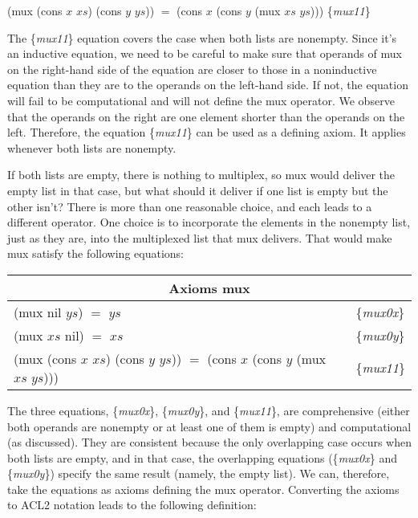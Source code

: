 \hspace{1cm} \textsf{(mux (cons $x$ $xs$) (cons $y$ $ys$)) $=$ (cons $x$ (cons $y$ (mux $xs$ $ys$)))}
\hfill \{\emph{mux11}\}

The \{\emph{mux11}\} equation covers the case when both lists are nonempty.
Since it's an inductive equation, we need to be careful to make sure
that operands of \textsf{mux} on the right-hand side of the equation
are closer to those in a noninductive equation than they are
to the operands on the left-hand side.
If not, the equation will fail to be computational and
will not define the \textsf{mux} operator.
We observe that the operands on the right
are one element shorter than the operands on the left.
Therefore, the equation \{\emph{mux11}\} can be used
as a defining axiom. It applies whenever both lists are nonempty.

If both lists are empty, there is nothing to multiplex,
so \textsf{mux} would deliver the empty list in that case, but
what should it deliver if one list is empty but the other isn't?
There is more than one reasonable choice, and each leads to
a different operator. One choice is to incorporate the elements
in the nonempty list, just as they are, into the
multiplexed list that \textsf{mux}  delivers.
That would make \textsf{mux} satisfy the following equations:

\begin{center}
\begin{tabular}{ll}
\multicolumn{2}{c}{Axioms \textsf{mux} \label{axioms:mux}}\\
\hline
\textsf{(mux nil $ys$) $=$ $ys$}  & \{\emph{mux0x}\}     \\
\textsf{(mux $xs$ nil) $=$ $xs$}  & \{\emph{mux0y}\}     \\
\textsf{(mux (cons $x$ $xs$) (cons $y$ $ys$)) $=$ (cons $x$ (cons $y$ (mux $xs$ $ys$)))} & \{\emph{mux11}\} \\
\end{tabular}
\end{center}

\label{def:mux}The three equations, \{\emph{mux0x}\}, \{\emph{mux0y}\}, and \{\emph{mux11}\},
are comprehensive (either both operands are nonempty
or at least one of them is empty) and computational (as discussed).
They are consistent because the only overlapping case
occurs when both lists are empty, and in that case,
the overlapping equations
(\{\emph{mux0x}\} and \{\emph{mux0y}\}) specify the same result
(namely, the empty list).
We can, therefore, take the equations as axioms
defining the \textsf{mux} operator.
Converting the axioms to ACL2 notation leads to the following
definition:

